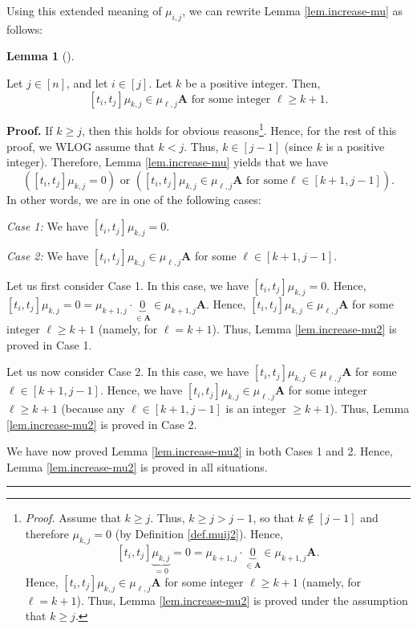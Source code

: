\documentclass[numbers=enddot,12pt,final,onecolumn,notitlepage]{scrartcl}%
\theoremstyle{definition}
\newtheorem{lem}[theo]{Lemma}
\newenvironment{lemma}[1][]
{\begin{lem}[#1]\begin{leftbar}}
{\end{leftbar}\end{lem}}
\newenvironment{proof}[1][Proof]{\noindent\textbf{#1.} }{\ \rule{0.5em}{0.5em}}
\begin{document}
Using this extended meaning of $\mu_{i,j}$, we can rewrite Lemma
\ref{lem.increase-mu} as follows:

\begin{lemma}
\label{lem.increase-mu2}Let $j\in\left[  n\right]  $, and let $i\in\left[
j\right]  $. Let $k$ be a positive integer. Then,
\[
\left[  t_{i},t_{j}\right]  \mu_{k,j}\in\mu_{\ell,j}\mathbf{A}\text{ for some
integer }\ell\geq k+1.
\]

\end{lemma}

\begin{proof}
If $k\geq j$, then this holds for obvious reasons\footnote{\textit{Proof.}
Assume that $k\geq j$. Thus, $k\geq j>j-1$, so that $k\notin\left[
j-1\right]  $ and therefore $\mu_{k,j}=0$ (by Definition \ref{def.muij2}).
Hence,%
\[
\left[  t_{i},t_{j}\right]  \underbrace{\mu_{k,j}}_{=0}=0=\mu_{k+1,j}%
\cdot\underbrace{0}_{\in\mathbf{A}}\in\mu_{k+1,j}\mathbf{A}.
\]
Hence, $\left[  t_{i},t_{j}\right]  \mu_{k,j}\in\mu_{\ell,j}\mathbf{A}$ for
some integer $\ell\geq k+1$ (namely, for $\ell=k+1$). Thus, Lemma
\ref{lem.increase-mu2} is proved under the assumption that $k\geq j$.}. Hence,
for the rest of this proof, we WLOG assume that $k<j$. Thus, $k\in\left[
j-1\right]  $ (since $k$ is a positive integer). Therefore, Lemma
\ref{lem.increase-mu} yields that we have%
\[
\left(  \left[  t_{i},t_{j}\right]  \mu_{k,j}=0\right)  \text{ or }\left(
\left[  t_{i},t_{j}\right]  \mu_{k,j}\in\mu_{\ell,j}\mathbf{A}\text{ for some
}\ell\in\left[  k+1,j-1\right]  \right)  .
\]
In other words, we are in one of the following cases:

\textit{Case 1:} We have $\left[  t_{i},t_{j}\right]  \mu_{k,j}=0$.

\textit{Case 2:} We have $\left[  t_{i},t_{j}\right]  \mu_{k,j}\in\mu_{\ell
,j}\mathbf{A}$ for some $\ell\in\left[  k+1,j-1\right]  $.

Let us first consider Case 1. In this case, we have $\left[  t_{i}%
,t_{j}\right]  \mu_{k,j}=0$. Hence, $\left[  t_{i},t_{j}\right]  \mu
_{k,j}=0=\mu_{k+1,j}\cdot\underbrace{0}_{\in\mathbf{A}}\in\mu_{k+1,j}%
\mathbf{A}$. Hence, $\left[  t_{i},t_{j}\right]  \mu_{k,j}\in\mu_{\ell
,j}\mathbf{A}$ for some integer $\ell\geq k+1$ (namely, for $\ell=k+1$). Thus,
Lemma \ref{lem.increase-mu2} is proved in Case 1.

Let us now consider Case 2. In this case, we have $\left[  t_{i},t_{j}\right]
\mu_{k,j}\in\mu_{\ell,j}\mathbf{A}$ for some $\ell\in\left[  k+1,j-1\right]
$. Hence, we have $\left[  t_{i},t_{j}\right]  \mu_{k,j}\in\mu_{\ell
,j}\mathbf{A}$ for some integer $\ell\geq k+1$ (because any $\ell\in\left[
k+1,j-1\right]  $ is an integer $\geq k+1$). Thus, Lemma
\ref{lem.increase-mu2} is proved in Case 2.

We have now proved Lemma \ref{lem.increase-mu2} in both Cases 1 and 2. Hence,
Lemma \ref{lem.increase-mu2} is proved in all situations.
\end{proof}
\end{document}
